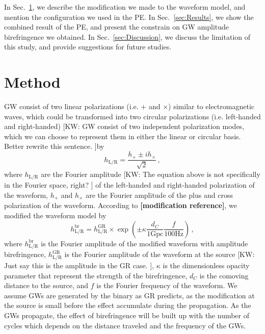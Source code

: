 \documentclass[aps,prd,twocolumn,superscriptaddress,preprintnumbers,floatfix,nofootinbib]{revtex4-2}
\newcommand{\kw}[1]{{\color{rb4}[KW: #1 ]}}
\begin{document}
In Sec.~\ref{sec:Method}, we describe the modification we made to the waveform
model, and mention the configuration we used in the PE. In
Sec.~\ref{sec:Results}, we show the combined result of the PE, and present the
constrain on GW amplitude birefringence we obtained. In
Sec.~\ref{sec:Discussion}, we discuss the limitation of this study, and provide
suggestions for future studies.

\section{Method}
\label{sec:Method}
GW consist of two linear polarizations (i.e. $+$ and $\times$) similar to
electromagnetic waves, which could be transformed into two circular
polarizations (i.e. left-handed and right-handed) \kw{GW consist of two
independent polarization modes, which we can choose to represent them in either
the linear or circular basis. Better rewrite this sentence.}by
\begin{equation}
    h_{\mathrm{L/R}} = \frac{h_+ \pm i h_\times}{\sqrt{2}}\,,
\end{equation}
where $h_{\mathrm{L/R}}$ are the Fourier amplitude \kw{The equation above is not
specifically in the Fourier space, right?} of the left-handed and right-handed
polarization of the waveform, $h_+$ and $h_\times$ are the Fourier amplitude of
the plus and cross polarization of the waveform. According to
\textbf{[modification reference]}, we modified the waveform model by
\begin{equation}
    h_\mathrm{L/R}^{\mathrm{br}}=
    h_\mathrm{L/R}^{\mathrm{GR}}\times
    \exp\left(\pm\kappa\frac{d_C}{1\mathrm{Gpc}}\frac{f}{100\mathrm{Hz}}\right)\,,
\end{equation}
where $h_\mathrm{L/R}^{\mathrm{br}}$ is the Fourier amplitude of the modified
waveform with amplitude birefringence, $h_\mathrm{L/R}^{\mathrm{GR}}$ is the
Fourier amplitude of the waveform at the source \kw{Just say this is the
amplitude in the GR case.}, $\kappa$ is the dimensionless opacity parameter that
represent the strength of the birefringence, $d_C$ is the comoving distance to
the source, and $f$ is the Fourier frequency of the waveform. We assume GWs are
generated by the binary as GR predicts, as the modification at the source is
small before the effect accumulate during the propagation. As the GWs propagate,
the effect of birefringence will be built up with the number of cycles which
depends on the distance traveled and the frequency of the GWs.
\end{document}
